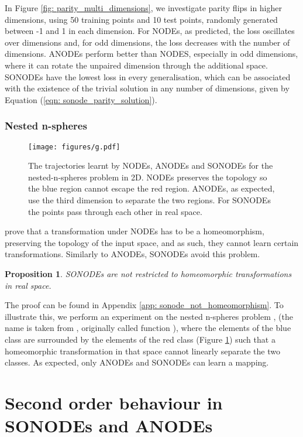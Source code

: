 \documentclass{article}
\newtheorem{proposition}[theorem]{Proposition}
\theoremstyle{remark}
\theoremstyle{definition}
\begin{document}
In Figure \ref{fig: parity_multi_dimensions}, we investigate parity flips in higher dimensions, using 50 training points and 10 test points, randomly generated between -1 and 1 in each dimension. For NODEs, as predicted, the loss oscillates over dimensions and, for odd dimensions, the loss decreases with the number of dimensions. ANODEs perform better than NODES, especially in odd dimensions, where it can rotate the unpaired dimension through the additional space. SONODEs have the lowest loss in every generalisation, which can be associated with the existence of the trivial solution in any number of dimensions, given by Equation (\ref{eqn: sonode_parity_solution}).

\subsubsection{Nested n-spheres}
\begin{figure}[b]
    \centering
    \texttt{[image: figures/g.pdf]}
    \caption{The trajectories learnt by NODEs, ANODEs and SONODEs for the nested-n-spheres problem in 2D. NODEs preserves the topology so the blue region cannot escape the red region. ANODEs, as expected, use the third dimension to separate the two regions. For SONODEs the points pass through each other in real space.}
    \label{fig: g}
\end{figure}

\citet{dupont2019augmented} prove that a transformation under NODEs has to be a homeomorphism, preserving the topology of the input space, and as such, they cannot learn certain transformations. Similarly to ANODEs, SONODEs avoid this problem.

\begin{proposition}
SONODEs are not restricted to homeomorphic transformations in real space.
\end{proposition}

The proof can be found in Appendix \ref{app: sonode_not_homeomorphism}. To illustrate this, we perform an experiment on the nested n-spheres problem \citep{dupont2019augmented}, (the name is taken from \cite{massaroli2020dissecting}, originally called  function \cite{dupont2019augmented}), where the elements of the blue class are surrounded by the elements of the red class (Figure \ref{fig: g}) such that a homeomorphic transformation in that space cannot linearly separate the two classes. As expected, only ANODEs and SONODEs can learn a mapping.

\section{Second order behaviour in SONODEs and ANODEs}
\label{sec: anodes_learn_2nd_order}
\end{document}
